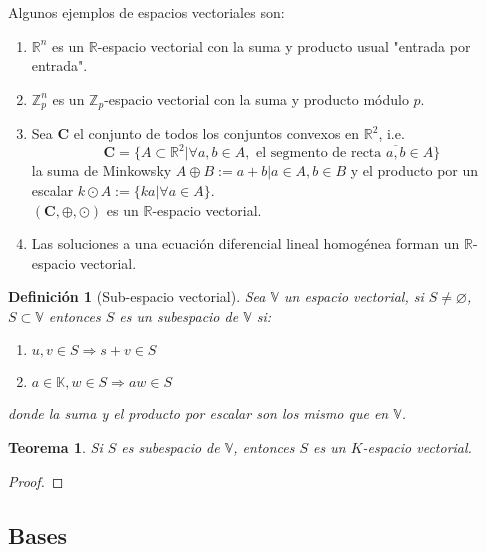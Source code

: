 \documentclass[14pt]{extarticle} %
\newtheorem{definicion}{Definición}
\newtheorem{teorema}{Teorema}
\theoremstyle{problemastyle} %
\newcommand{\kampo}{\mathbb{K}}
\newcommand{\evV}{\mathbb{V}} %
\newcommand{\bb}[1]{\mathbb{#1}}
\begin{document}
\begin{tcolorbox}
Algunos ejemplos de espacios vectoriales son:
    \begin{enumerate}
        \item $\bb{R}^n$ es un $\bb R $-espacio vectorial con la suma y producto usual "entrada por entrada".
        \item $\bb Z_p^n$ es un $\bb Z_p$-espacio vectorial con la suma y producto módulo $p$.
        \item Sea $\mathbf{C}$ el conjunto de todos los conjuntos convexos en $\bb R^2$, i.e.
        $$\mathbf{C} = \{ A \subset \bb R ^2 |  \forall a,b \in A, \text{ el segmento de recta } \overline{a,b} \in A\}$$
        la suma de Minkowsky $A\oplus B := {a+b| a\in A, b\in B}$ y el producto por un escalar $k\odot A := \{ ka | \forall a \in  A\}$. \\
        $(\mathbf{C}, \oplus, \odot) $ es un $\bb R$-espacio vectorial.
        \item Las soluciones a una ecuación diferencial lineal homogénea forman un $\bb R$-espacio vectorial. 
    \end{enumerate}
\end{tcolorbox}

\begin{definicion}[Sub-espacio vectorial]
    Sea $\evV$ un espacio vectorial, si $S\neq \varnothing $, $S\subset \evV$ entonces $S$ es un subespacio de $\evV$ si:
    \begin{enumerate}
        \item $u,v \in S \Rightarrow s+v \in S $
        \item $a \in \kampo , w \in S \Rightarrow aw \in S $
        
    \end{enumerate}
    
    donde la suma y el producto por escalar son los mismo que en $\evV$.
\end{definicion}

\begin{teorema}
    Si $S$ es subespacio de $\evV$, entonces $S$ es un $K$-espacio vectorial.
\end{teorema}
\begin{proof}
    \todo{}
\end{proof}

\subsection{Bases}
\end{document}
